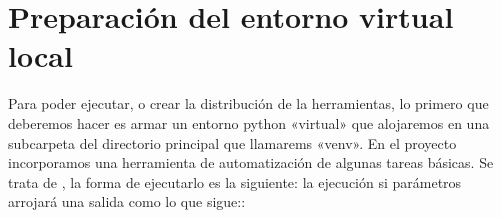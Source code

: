 \documentclass[a4paper,12pt,spanish]{sphinxmanual}
\begin{document}
\section{Preparación del entorno virtual local}
\label{\detokenize{desarrollo:preparacion-del-entorno-virtual-local}}
Para poder ejecutar, o crear la distribución de la herramientas, lo primero que deberemos hacer es armar un entorno
python «virtual» que alojaremos en una subcarpeta del directorio principal que llamarems «venv». En el proyecto incorporamos
una herramienta de automatización de algunas tareas básicas. Se trata de , la forma de ejecutarlo es la siguiente:
 la ejecución si parámetros arrojará una salida como lo que sigue::

\begin{sphinxVerbatim}[commandchars=\\\{\}]
      
    

   \PYG{p}{[}\PYG{p}{]}

   
         
            
        
             
              

       
\end{sphinxVerbatim}
\end{document}
